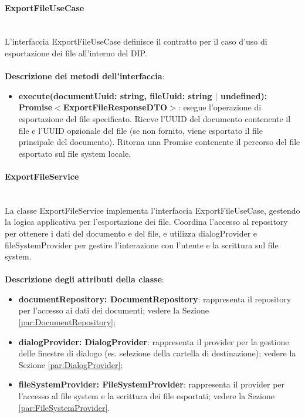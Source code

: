 \documentclass[a4paper,12pt]{article}
\begin{document}
{{{                \paragraph{ExportFileUseCase}\label{par:ExportFileUseCase}\mbox{}\\
                L'interfaccia ExportFileUseCase definisce il contratto per il caso d'uso di esportazione dei file all'interno del DIP.\\
                \\
              \noindent \textbf{Descrizione dei metodi dell'interfaccia}:
                \begin{itemize}
                    \item \textbf{execute(documentUuid: string, fileUuid: string $|$ undefined):\\ Promise$<$ExportFileResponseDTO$>$}: esegue l'operazione di esportazione del file specificato. Riceve l'UUID del documento contenente il file e l'UUID opzionale del file (se non fornito, viene esportato il file principale del documento). Ritorna una Promise contenente il percorso del file esportato sul file system locale.
                \end{itemize}

                \paragraph{ExportFileService}\label{par:ExportFileService}\mbox{}\\
                La classe ExportFileService implementa l'interfaccia ExportFileUseCase, gestendo la logica applicativa per l'esportazione dei file. Coordina l'accesso al repository per ottenere i dati del documento e del file, e utilizza dialogProvider e fileSystemProvider per gestire l'interazione con l'utente e la scrittura sul file system.\\
                \\
                \textbf{Descrizione degli attributi della classe}:
                \begin{itemize}
                    \item \textbf{documentRepository: DocumentRepository}: rappresenta il repository per l'accesso ai dati dei documenti; vedere la Sezione \ref{par:DocumentRepository};
                    \item \textbf{dialogProvider: DialogProvider}: rappresenta il provider per la gestione delle finestre di dialogo (es. selezione della cartella di destinazione); vedere la Sezione \ref{par:DialogProvider};
                    \item \textbf{fileSystemProvider: FileSystemProvider}: rappresenta il provider per l'accesso al file system e la scrittura dei file esportati; vedere la Sezione \ref{par:FileSystemProvider}.
                \end{itemize}
                
}}}
\end{document}
